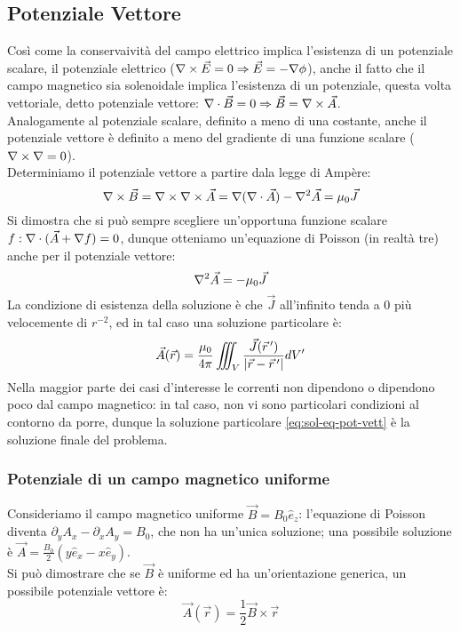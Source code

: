 \documentclass[]{article}
\begin{document}
\subsection{Potenziale Vettore}

Così come la conservaività del campo elettrico implica l'esistenza di un potenziale scalare, il potenziale elettrico ($ \nabla\times\vec{E} = 0 \Rightarrow \vec{E} = - \nabla \phi $), anche  il fatto che il campo magnetico sia solenoidale implica l'esistenza di un potenziale, questa volta vettoriale, detto potenziale vettore: $ \nabla\cdot\vec{B} = 0 \Rightarrow \vec{B} = \nabla\times\vec{A} $. \\ 
%
Analogamente al potenziale scalare, definito a meno di una costante, anche il potenziale vettore è definito a meno del gradiente di una funzione scalare ($ \nabla\times\nabla = 0 $). \\ 
%
Determiniamo il potenziale vettore a partire dala legge di Ampère:
\begin{equation}
	\nabla\times\vec{B} = \nabla\times\nabla\times\vec{A} = \nabla(\nabla\cdot\vec{A}) - \nabla^2\vec{A} = \mu_0 \vec{J}
	\label{eq:}
\end{equation}
Si dimostra che si può sempre scegliere un'opportuna funzione scalare $ f : \nabla\cdot(\vec{A} + \nabla f) = 0 $, dunque otteniamo un'equazione di Poisson (in realtà tre) anche per il potenziale vettore:
\begin{equation}
	\nabla^2\vec{A} = - \mu_0 \vec{J}
	\label{eq:eq-pot-vett}
\end{equation}
La condizione di esistenza della soluzione è che $ \vec{J} $ all'infinito tenda a $ 0 $ più velocemente di $ r^{-2} $, ed in tal caso una soluzione particolare è:
\begin{equation}
	\vec{A}(\vec{r}) = \displaystyle\frac{\mu_0}{4\pi} \iiint_V \displaystyle\frac{\vec{J}(\vec{r}\,')}{\left\lvert\vec{r} - \vec{r}\,'\right\rvert} dV'
	\label{eq:sol-eq-pot-vett}
\end{equation}
Nella maggior parte dei casi d'interesse le correnti non dipendono o dipendono poco dal campo magnetico: in tal caso, non vi sono particolari condizioni al contorno da porre, dunque la soluzione particolare \ref{eq:sol-eq-pot-vett} è la soluzione finale del problema.

\subsubsection{Potenziale di un campo magnetico uniforme}

Consideriamo il campo magnetico uniforme $ \vec{B} = B_0 \hat{e}_z $: l'equazione di Poisson diventa $ \partial_y A_x - \partial_x A_y = B_0 $, che non ha un'unica soluzione; una possibile soluzione è $ \vec{A} = \frac{B_0}{2} (y\hat{e}_x - x\hat{e}_y) $. \\ 
%
Si può dimostrare che se $\vec{B} $ è uniforme ed ha un'orientazione generica, un possibile potenziale vettore è:
\begin{equation}
	\vec{A}(\vec{r}) = \displaystyle\frac{1}{2} \vec{B}\times\vec{r}
	\label{eq:pot-b-unif}
\end{equation}
\end{document}
